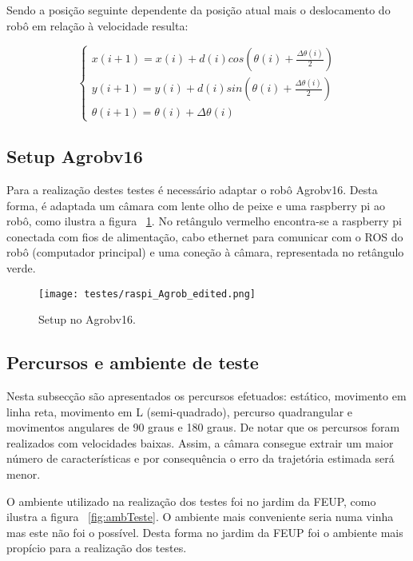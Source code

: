 Sendo a posição seguinte dependente da posição atual mais o deslocamento do robô em relação à velocidade resulta:

\[ \left\{\begin{array}{ccc}
x(i+1) = x(i) + d(i) cos( \theta(i) + \frac{\Delta \theta(i)}{2})\\ 
y(i+1) = y(i) + d(i) sin( \theta(i) + \frac{\Delta \theta(i)}{2})\\ 
\theta (i+1) = \theta (i) + \Delta \theta (i)
\end{array}\right. \]



\subsection{Setup Agrobv16}


Para a realização destes testes é necessário adaptar o robô Agrobv16. Desta forma, é adaptada um câmara com lente olho de peixe e uma raspberry pi ao robô, como ilustra a figura ~\ref{fig:adptPicam}. No retângulo vermelho encontra-se a raspberry pi conectada com fios de alimentação, cabo ethernet para comunicar com o ROS do robô (computador principal) e uma coneção à câmara, representada no retângulo verde.


\begin{figure}[h!] 
	\begin{center}
		\leavevmode		
		\texttt{[image: testes/raspi\_Agrob\_edited.png]}
		\caption{Setup no Agrobv16.}
		\label{fig:adptPicam}
	\end{center}
\end{figure}


\FloatBarrier
\subsection{Percursos e ambiente de teste}


Nesta subsecção são apresentados os percursos efetuados: estático, movimento em linha reta, movimento em L (semi-quadrado), percurso quadrangular e movimentos angulares de 90 graus e 180 graus. De notar que os percursos foram realizados com velocidades baixas. Assim, a câmara consegue extrair um maior número de características e por consequência o erro da trajetória estimada será menor. 


O ambiente utilizado na realização dos testes foi no  jardim da FEUP, como ilustra a figura ~\ref{fig:ambTeste}. O ambiente mais conveniente seria numa vinha mas este não foi o possível. Desta forma no jardim da FEUP foi o ambiente mais propício para a realização dos testes. 


